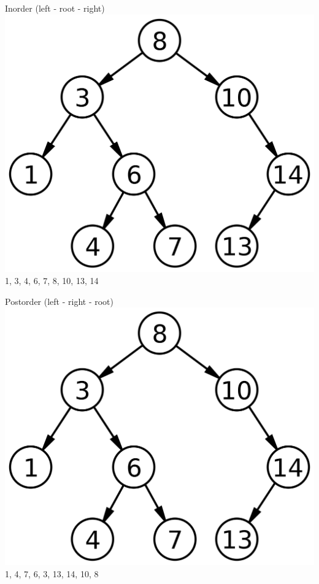 \begin{frame}[fragile]
Inorder (left - root - right)\\
\vspace{1mm}
\includegraphics[scale=0.05]{img/binarytree_2.png}\\
\vspace{1mm}
1, 3, 4, 6, 7, 8, 10, 13, 14
\end{frame}

\begin{frame}[fragile]
Postorder (left - right - root)\\
\vspace{1mm}
\includegraphics[scale=0.05]{img/binarytree_2.png}\\
\vspace{1mm}
1, 4, 7, 6, 3, 13, 14, 10, 8
\end{frame}

